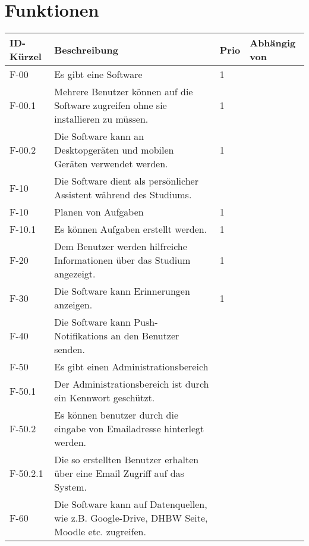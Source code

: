 \chapter{Funktionen}


\begin{table}[H]
    \label{Funktionen::main}
    \begin{longtable}{|l|l|l|l}
        \toprule
        \textbf{ID-Kürzel} & \textbf{Beschreibung} & \textbf{Prio} & \textbf{Abhängig von} \\
        \endhead
        \hline
        F-00 & Es gibt eine Software & 1 & \\
        F-00.1 & Mehrere Benutzer können auf die Software zugreifen ohne sie installieren zu müssen. & 1 & \\
        F-00.2 & Die Software kann an Desktopgeräten und mobilen Geräten verwendet werden. & 1 & \\
        \hline
        F-10 & Die Software dient als persönlicher Assistent während des Studiums. & & \\
        F-10 & Planen von Aufgaben & 1 & \\
        F-10.1 & Es können Aufgaben erstellt werden. & 1 & \\

        F-20 & Dem Benutzer werden hilfreiche Informationen über das Studium angezeigt. & 1 & \\

        F-30 & Die Software kann Erinnerungen anzeigen. & 1 & \\

        F-40 & Die Software kann Push-Notifikations an den Benutzer senden. & & \\

        F-50 & Es gibt einen Administrationsbereich & & \\
        F-50.1 & Der Administrationsbereich ist durch ein Kennwort geschützt. & & \\ %
        F-50.2 & Es können benutzer durch die eingabe von Emailadresse hinterlegt werden. & & \\
        F-50.2.1 & Die so erstellten Benutzer erhalten über eine Email Zugriff auf das System. & & \\ %
        
        F-60 & Die Software kann auf Datenquellen, wie z.B. Google-Drive, DHBW Seite, Moodle etc. zugreifen. & & \\


\end{longtable}
\end{table}
